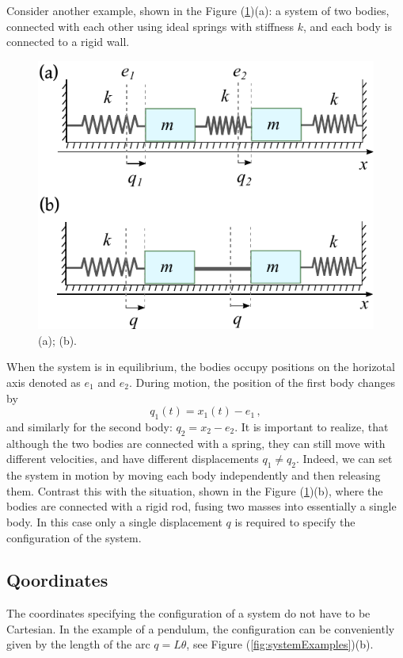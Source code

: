 Consider another example, shown in the Figure
(\ref{fig:coupledSystem})(a): a system of
two bodies, connected with each other using ideal springs with
stiffness $k$, and each body is connected to a rigid wall.
\begin{figure}[htbp]
	\centering
	\includegraphics[scale=1.0]{coupledSystem}
	\caption{(a); (b).}
	\label{fig:coupledSystem}
\end{figure}

When the system is in equilibrium, the bodies occupy positions on the
horizotal axis denoted as $e_1$ and $e_2$. During motion, the position
of the first body changes by
\begin{equation*}
	q_1(t) = x_1(t) - e_1\, ,
\end{equation*}
and similarly for the second body: $q_2 = x_2 - e_2$. It is important
to realize, that although the two bodies are connected with a spring,
they can still move with different velocities, and have different
displacements $q_1 \ne q_2$. Indeed, we can set the system in motion
by moving each body independently and then releasing them. Contrast
this with the situation, shown in the Figure
(\ref{fig:coupledSystem})(b), where the bodies are connected with a
rigid rod, fusing two masses into essentially a single body. In this
case only a single displacement $q$ is required to specify the
configuration of the system.

\subsection{Qoordinates}
The coordinates specifying the configuration of a system do not
have to be Cartesian. In the example of a pendulum, the configuration
can be conveniently given by the length of the arc $q=L\theta$, see
Figure (\ref{fig:systemExamples})(b).


